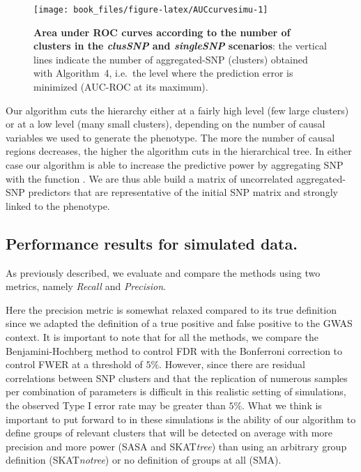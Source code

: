 \documentclass[]{book}
\begin{document}
\begin{figure}

{\centering \texttt{[image: book\_files/figure-latex/AUCcurvesimu-1]} 

}

\caption{\textbf{Area under ROC curves according to the number of clusters in the \emph{clusSNP} and \emph{singleSNP} scenarios}: the vertical lines indicate the number of aggregated-SNP (clusters) obtained with Algorithm~4, i.e.~the level where the prediction error is minimized (AUC-ROC at its maximum).}\label{fig:AUCcurvesimu}
\end{figure}

Our algorithm cuts the hierarchy either at a fairly high level (few
large clusters) or at a low level (many small clusters), depending on
the number of causal variables we used to generate the phenotype. The
more the number of causal regions decreases, the higher the algorithm
cuts in the hierarchical tree. In either case our algorithm is able to
increase the predictive power by aggregating SNP with the function . We
are thus able build a matrix of uncorrelated aggregated-SNP predictors
that are representative of the initial SNP matrix and strongly linked to
the phenotype.

\hypertarget{performance-results-for-simulated-data.}{%
\subsection{Performance results for simulated data.}\label{performance-results-for-simulated-data.}}

As previously described, we evaluate and compare the methods using two
metrics, namely \emph{Recall} and \emph{Precision}.

Here the precision metric is somewhat relaxed compared to its true
definition since we adapted the definition of a true positive and false
positive to the GWAS context. It is important to note that for all the
methods, we compare the Benjamini-Hochberg method to control FDR with
the Bonferroni correction to control FWER at a threshold of \(5\%\).
However, since there are residual correlations between SNP clusters and
that the replication of numerous samples per combination of parameters
is difficult in this realistic setting of simulations, the observed Type
I error rate may be greater than \(5\%\). What we think is important to
put forward to in these simulations is the ability of our algorithm to
define groups of relevant clusters that will be detected on average with
more precision and more power (SASA and SKAT\emph{tree}) than using an
arbitrary group definition (SKAT\emph{notree}) or no definition of groups at
all (SMA).
\end{document}
